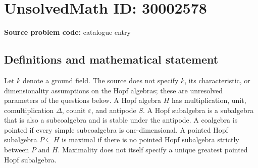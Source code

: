 \documentclass[11pt]{article}
\begin{document}
\section*{UnsolvedMath ID: 30002578}
\textbf{Source problem code:} catalogue entry
\subsection{Definitions and mathematical statement}
Let \(k\) denote a ground field. The source does not specify \(k\), its characteristic, or dimensionality assumptions on the Hopf algebras; these are unresolved parameters of the questions below. A Hopf algebra \(H\) has multiplication, unit, comultiplication \(\Delta\), counit \(\varepsilon\), and antipode \(S\). A Hopf subalgebra is a subalgebra that is also a subcoalgebra and is stable under the antipode. A coalgebra is pointed if every simple subcoalgebra is one-dimensional. A pointed Hopf subalgebra \(P\subseteq H\) is maximal if there is no pointed Hopf subalgebra strictly between \(P\) and \(H\). Maximality does not itself specify a unique greatest pointed Hopf subalgebra.
\end{document}
